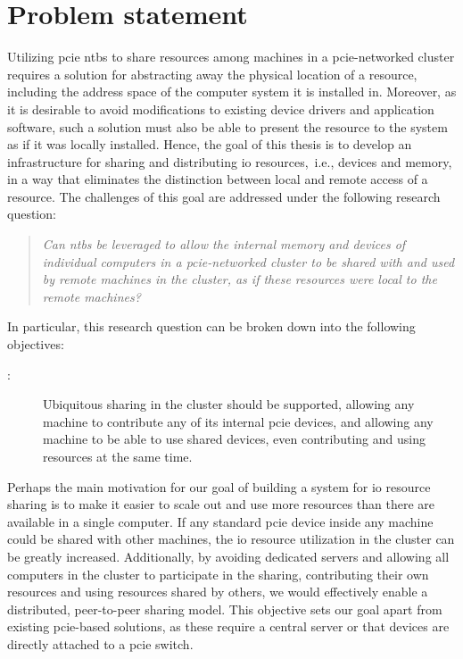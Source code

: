 \section{Problem statement}\label{sec:objectives}
Utilizing \gls{pcie} \glspl{ntb} to share resources among machines in a \gls{pcie}-networked cluster requires a 
solution for abstracting away the physical location of a resource, including the address space of the computer system it is installed in. Moreover, as it is desirable to avoid modifications to existing device drivers and application software, such a solution must also be able to present the resource to the system as if it was locally installed.
%
Hence, the goal of this thesis is to develop an infrastructure for sharing and distributing \gls{io} resources,~i.e., devices and memory, in a way that eliminates the distinction between local and remote access of a resource. The challenges of this goal are addressed under the following research question: 
\begin{quote}\itshape
    Can \glspl{ntb} be leveraged to allow the internal memory and devices of individual computers in a \gls{pcie}-networked cluster to be shared with and used by remote machines in the cluster, as if these resources were local to the remote machines?
\end{quote}
%
In particular, this research question can be broken down into the following objectives:
%
\begin{description}
    \item[:] Ubiquitous sharing in the cluster should be supported, allowing any machine to contribute any of its internal \gls{pcie} devices, and allowing any machine to be able to use shared devices, even contributing and using resources at the same time.
\end{description}
Perhaps the main motivation for our goal of building a system for \gls{io} resource sharing is to make it easier to scale out and use more resources than there are available in a single computer. 
If any standard \gls{pcie} device inside any machine could be shared with other machines, the \gls{io} resource utilization in the cluster can be greatly increased.
Additionally, by avoiding dedicated servers and allowing all computers in the cluster to participate in the sharing, contributing their own resources and using resources shared by others, we would effectively enable a distributed, peer-to-peer sharing model. This objective sets our goal apart from existing \gls{pcie}-based solutions, as these require a central server or that devices are directly attached to a \gls{pcie} switch.

